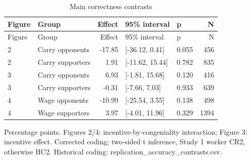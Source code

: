 
\begin{longtable}[t]{llrllr}
\caption{Main correctness contrasts}\\
\toprule
Figure & Group & Effect & 95\% interval & p & N\\
\midrule
\endfirsthead
\toprule
Figure & Group & Effect & 95\% interval & p & N\\
\midrule
\endhead
2 & Carry opponents & -17.85 & {}[-36.12, 0.41] & 0.055 & 456\\
2 & Carry supporters & 1.91 & {}[-11.62, 15.44] & 0.782 & 835\\
3 & Carry opponents & 6.93 & {}[-1.81, 15.68] & 0.120 & 416\\
3 & Carry supporters & -0.31 & {}[-7.66, 7.03] & 0.933 & 639\\
4 & Wage opponents & -10.99 & {}[-25.54, 3.55] & 0.138 & 498\\
4 & Wage supporters & 3.97 & {}[-4.01, 11.96] & 0.329 & 1394\\
\bottomrule
\end{longtable}
\noindent\footnotesize Percentage points. Figures 2/4: incentive-by-congeniality interaction; Figure 3: incentive effect. Corrected coding; two-sided t inference, Study 1 worker CR2, otherwise HC2. Historical coding: replication\_accuracy\_contrasts.csv.\par\normalsize
